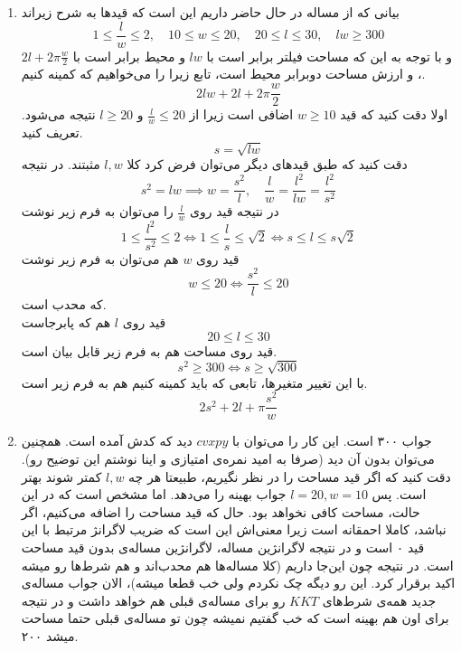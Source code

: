 \begin{enumerate}
	\item بیانی که از مساله در حال حاضر داریم این است که قید‌ها به شرح زیراند
	\[
	1 \le \frac{l}{w} \le 2, \quad 10 \le w \le 20 ,\quad 20 \le l \le 30, \quad lw \ge 300
	\]
	و با توجه به این که مساحت فیلتر برابر است با
	$lw$
	و محیط برابر است با 
	$2l + 2\pi\frac{w}{2}$،
	و ارزش مساحت دوبرابر محیط است، تابع زیرا را می‌خواهیم که کمینه کنیم.
	\[
	2lw + 2l + 2\pi\frac{w}{2}
	\]
	اولا دقت کنید که قید
	$w \ge 10$
	اضافی است زیرا از
	$\frac{l}{w} \le 20$
	و
	$l \ge 20$
	نتیجه می‌شود. تعریف کنید.
	\[
	s = \sqrt{lw}
	\]
	دقت کنید که طبق قید‌های دیگر می‌توان فرض کرد کلا $l, w$ مثبتند. در نتیجه
	\[
	s^2 = lw \implies
	w = \frac{s^2}{l}, \quad \frac{l}{w} = \frac{l^2}{lw} = \frac{l^2}{s^2}
	\]
	در نتیجه قید روی 
	$\frac{l}{w}$
	را می‌توان به فرم زیر نوشت
	\[
	1 \le \frac{l^2}{s^2} \le 2 \iff 1 \le \frac{l}{s} \le \sqrt{2} \iff s \le l \le s\sqrt{2}
	\]
	قید روی $w$ هم می‌توان به فرم زیر نوشت
	\[
	w \le 20 \iff \frac{s^2}{l} \le 20
	\]
	که محدب است.\\
	قید روی $l$ هم که پابرجاست
	\[
	20 \le l \le 30
	\]
	قید روی مساحت هم به فرم زیر قابل بیان است.
	\[
	s^2 \ge 300 \iff s \ge \sqrt{300}
	\]
	با این تغییر متغیر‌ها، تابعی که باید کمینه کنیم هم به فرم زیر است.
	\[
	2s^2 + 2l + \pi\frac{s^2}{w}
	\]
	\item 
	جواب ۳۰۰ است. این کار را می‌توان با $cvxpy$ دید که کدش آمده است. همچنین می‌توان بدون آن دید (صرفا به امید نمره‌ی امتیازی و اینا نوشتم این توضیح رو). 
دقت کنید که اگر قید مساحت را در نظر نگیریم، طبیعتا هر چه $l, w$ کمتر شوند بهتر است. پس 
$l=20, w = 10$
جواب بهینه را می‌دهد. اما مشخص است که در این حالت، مساحت کافی نخواهد بود. حال که قید مساحت را اضافه می‌کنیم، اگر 
نباشد، کاملا احمقانه است زیرا معنی‌اش این است که ضریب لاگرانژ مرتبط با این قید ۰ است و در نتیجه لاگرانژین مساله، لاگرانژین مساله‌‌ی بدون قید مساحت است. در نتیجه چون این‌جا 
داریم (کلا مساله‌ها هم محدب‌اند و هم شرط‌ها رو میشه اکید برقرار کرد. این رو دیگه چک نکردم ولی خب قطعا میشه)، الان جواب مساله‌ی جدید همه‌ی شرط‌های $KKT$ رو برای مساله‌ی قبلی هم خواهد داشت و در نتیجه برای اون هم بهینه است که خب گفتیم نمیشه چون تو مساله‌ی قبلی حتما مساحت میشد ۲۰۰. 
\end{enumerate}